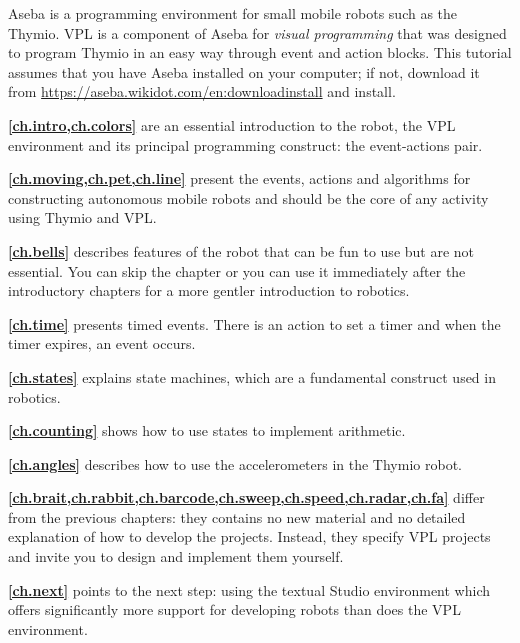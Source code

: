 Aseba is a programming environment for small mobile robots such as the
Thymio. VPL is a component of Aseba for \textit{visual programming} that
was designed to program Thymio in an easy way through event and action
blocks. This tutorial assumes that you have Aseba installed on your
computer; if not, download it from 
\url{https://aseba.wikidot.com/en:downloadinstall} and install.

\newpage


\textbf{\cref{ch.intro,ch.colors}} are an essential
introduction to the robot, the VPL environment and its principal
programming construct: the event-actions pair.

\textbf{\cref{ch.moving,ch.pet,ch.line}} present the events,
actions and algorithms for constructing autonomous mobile robots and
should be the core of any activity using Thymio and VPL.

\textbf{\cref{ch.bells}} describes features of the robot that can
be fun to use but are not essential. You can skip the chapter or you can
use it immediately after the introductory chapters for a more gentler
introduction to robotics.



\textbf{\cref{ch.time}} presents timed events. There is an action
to set a timer and when the timer expires, an event occurs.

\textbf{\cref{ch.states}} explains state machines, which are a
fundamental construct used in robotics.

\textbf{\cref{ch.counting}} shows how to use states to implement
arithmetic.

\textbf{\cref{ch.angles}} describes how to use the accelerometers
in the Thymio robot.

\textbf{\cref{ch.brait,ch.rabbit,ch.barcode,ch.sweep,ch.speed,ch.radar,ch.fa}}
differ from the previous chapters: they contains no new material and no
detailed explanation of how to develop the projects. Instead, they
specify VPL projects and invite you to design and implement them
yourself.

\textbf{\cref{ch.next}} points to the next step: using the
textual Studio environment which offers significantly more support for
developing robots than does the VPL environment.

